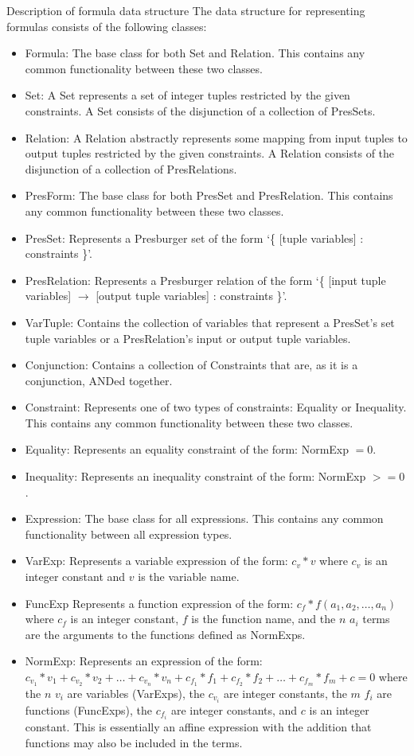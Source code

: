 \documentclass[journal,10pt]{IEEEtran}
\begin{document}
\begin{section}{Description of formula data structure}
The data structure for representing formulas consists of the following classes:

\begin{itemize}
\item Formula:
	The base class for both Set and Relation.
	This contains any common functionality between these two classes.
\item Set:
	A Set represents a set of integer tuples restricted by the given constraints.
	A Set consists of the disjunction of a collection of PresSets.
\item Relation:
	A Relation abstractly represents some mapping from input tuples to output tuples restricted by the given constraints.
	A Relation consists of the disjunction of a collection of PresRelations.
\item PresForm:
	The base class for both PresSet and PresRelation.
	This contains any common functionality between these two classes.
\item PresSet:
	Represents a Presburger set of the form `\{ [tuple variables] : constraints \}'.
\item PresRelation:
	Represents a Presburger relation of the form `\{ [input tuple variables] $\rightarrow$ [output tuple variables] : constraints \}'.
\item VarTuple:
	Contains the collection of variables that represent a PresSet's set tuple variables or a PresRelation's input or output tuple variables.
\item Conjunction:
	Contains a collection of Constraints that are, as it is a conjunction, ANDed together.
\item Constraint:
	Represents one of two types of constraints: Equality or Inequality.
	This contains any common functionality between these two classes.
\item Equality:
	Represents an equality constraint of the form: NormExp $=0$.
\item Inequality:
	Represents an inequality constraint of the form: NormExp $>=0$.
\item Expression:
	The base class for all expressions.
	This contains any common functionality between all expression types.
\item VarExp:
	Represents a variable expression of the form: $c_v*v$ where $c_v$ is an integer constant and $v$ is the variable name.
\item FuncExp
	Represents a function expression of the form: $c_f*f(a_{1},a_{2},\ldots,a_{n})$ where $c_f$ is an integer constant, $f$ is the function name, and the $n$ $a_{i}$ terms are the arguments to the functions defined as NormExps.
\item NormExp:
	Represents an expression of the form: $c_{v_1}*v_{1} + c_{v_2}*v_{2} + \ldots + c_{v_n}*v_{n} + c_{f_1}*f_{1} + c_{f_2}*f_{2} + \ldots + c_{f_m}*f_{m} + c = 0$ where the $n$ $v_{i}$ are variables (VarExps), the $c_{v_i}$ are integer constants, the $m$ $f_{i}$ are functions (FuncExps), the $c_{f_i}$ are integer constants, and $c$ is an integer constant.
	This is essentially an affine expression with the addition that functions may also be included in the terms.
\end{itemize}


\end{section}
\end{document}
